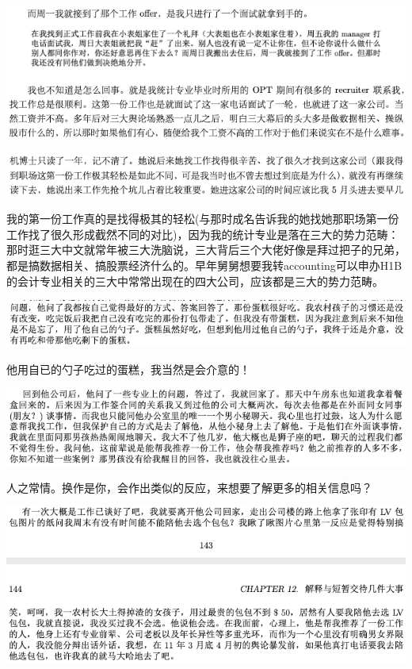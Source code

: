 \documentclass[9pt, b5paper]{article}
\begin{document}
\begin{center}
\includegraphics[width=.9\linewidth]{./pic/backups_plans_20210412_113237.png}
\end{center}

\begin{center}
\includegraphics[width=.9\linewidth]{./pic/backups_plans_20210412_113317.png}
\end{center}

我的第一份工作真的是找得极其的轻松(与那时成名告诉我的她找她那职场第一份工作找了很久形成截然不同的对比)，因为我的统计专业是落在三大的势力范畴：那时逛三大中文就常年被三大洗脑说，三大背后三个大佬好像是拜过把子的兄弟，都是搞数据相关、搞股票经济什么的。早年舅舅想要我转accounting可以申办H1B的会计专业相关的三大中常常出现在的四大公司，应该都是三大的势力范畴。

\begin{center}
\includegraphics[width=.9\linewidth]{./pic/backups_plans_20210412_104506.png}
\end{center}

他用自已的勺子吃过的蛋糕，我当然是会介意的！

\begin{center}
\includegraphics[width=.9\linewidth]{./pic/backups_plans_20210412_104626.png}
\end{center}

人之常情。换作是你，会作出类似的反应，来想要了解更多的相关信息吗？

\begin{center}
\includegraphics[width=.9\linewidth]{./pic/backups_plans_20210412_104740.png}
\end{center}
\end{document}
